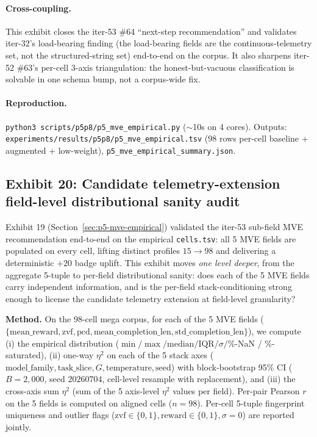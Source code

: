 \documentclass{article}  \usepackage[preprint,nonatbib]{neurips_2026} \usepackage[numbers]{natbib}
\providecommand{\secref}[1]{Section~\ref{#1}}
\begin{document}
\paragraph{Cross-coupling.} This exhibit closes the iter-53 \#64
``next-step recommendation'' and validates iter-32's load-bearing
finding (the load-bearing fields are the continuous-telemetry set,
not the structured-string set) end-to-end on the corpus. It also
sharpens iter-52 \#63's per-cell 3-axis triangulation: the
honest-but-vacuous classification is solvable in one schema bump, not
a corpus-wide fix.

\paragraph{Reproduction.}
\texttt{python3 scripts/p5p8/p5\_mve\_empirical.py} ($\sim$10s on 4
cores). Outputs:
\texttt{experiments/results/p5p8/p5\_mve\_empirical.tsv} (98 rows per-cell
baseline + augmented + low-weight),
\texttt{p5\_mve\_empirical\_summary.json}.

\subsection{Exhibit 20: Candidate telemetry-extension field-level distributional sanity audit}
\label{sec:p5-mve-field-audit}

Exhibit 19 (\secref{sec:p5-mve-empirical}) validated the iter-53
sub-field MVE recommendation end-to-end on the empirical \texttt{cells.tsv}:
all 5 MVE fields are populated on every cell, lifting distinct profiles
$15 \rightarrow 98$ and delivering a deterministic $+20$ badge
uplift. This exhibit moves \emph{one level deeper}, from the aggregate
5-tuple to per-field distributional sanity: does each of the 5 MVE
fields carry independent information, and is the per-field
stack-conditioning strong enough to license the candidate telemetry
extension at field-level granularity?

\textbf{Method.} On the 98-cell mega corpus, for each of the 5 MVE
fields
($\{\mathrm{mean\_reward}, \mathrm{zvf}, \mathrm{pcd},
\mathrm{mean\_completion\_len}, \mathrm{std\_completion\_len}\}$),
we compute (i) the empirical distribution
($\min / \max / \mathrm{median} / \mathrm{IQR} / \sigma / \%$-NaN /
\%-saturated), (ii) one-way $\eta^2$ on each of the 5 stack axes
($\mathrm{model\_family}, \mathrm{task\_slice}, G,
\mathrm{temperature}, \mathrm{seed}$) with block-bootstrap 95\% CI
($B{=}2{,}000$, seed $20260704$, cell-level resample with
replacement), and (iii) the cross-axis sum $\eta^2$ (sum of the 5
axis-level $\eta^2$ values per field). Per-pair Pearson $r$ on the 5
fields is computed on aligned cells ($n{=}98$). Per-cell 5-tuple
fingerprint uniqueness and outlier flags
($\mathrm{zvf} \in \{0,1\}, \mathrm{reward} \in \{0,1\}, \sigma = 0$)
are reported jointly.
\end{document}
